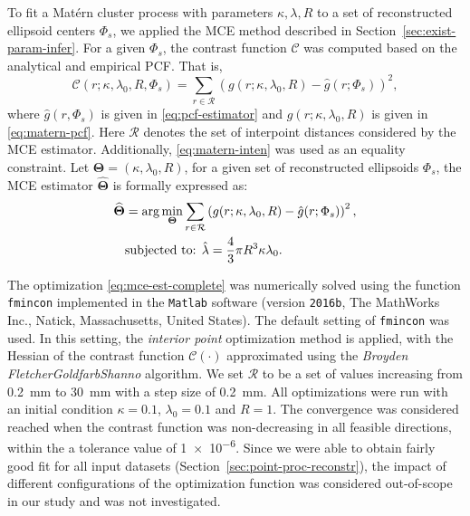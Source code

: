 \documentclass[journal]{IEEEtran}
\begin{document}
To fit a Mat\'ern cluster process with parameters $\kappa, \lambda, R$
to a set of reconstructed ellipsoid centers $\Phi_s$, we applied the
MCE method described in Section~\ref{sec:exist-param-infer}. For a
given $\Phi_s$, the contrast function $\mathcal{C}$ was computed based
on the analytical and empirical PCF. That is,
\begin{equation}
  \label{eq:matern-contrast}
  \mathcal{C}(r; \kappa, \lambda_0, R, \Phi_s) =
  \sum_{r \in \mathcal{R}} (g(r; \kappa, \lambda_0, R) -
  \hat{g}(r; \Phi_s))^2,
\end{equation}
where $\hat{g}(r, \Phi_s)$ is given in \eqref{eq:pcf-estimator} and
$g(r; \kappa, \lambda_0, R)$ is given in \eqref{eq:matern-pcf}. Here
$\mathcal{R}$ denotes the set of interpoint distances considered by
the MCE estimator. Additionally, \eqref{eq:matern-inten} was used as
an equality constraint. Let
$\mathbf{\Theta} = \left( \kappa, \lambda_0, R \right)$, for a given
set of reconstructed ellipsoids $\Phi_s$, the MCE estimator
$\widehat{\mathbf{\Theta}}$ is formally expressed as:
\begin{equation}
  \label{eq:mce-est-complete}
  \begin{aligned}
    \widehat{\mathbf{\Theta}} & = \arg \min_{\mathbf{\Theta}} \sum_{r
      \in \mathcal{R}} \left( g(r; \kappa, \lambda_0, R)
      - \hat{g}(r; \Phi_s) \right)^2, \\
    & \textnormal{subjected to: } \hat{\lambda} = \frac{4}{3}\pi
    R^3\kappa \lambda_0.
  \end{aligned}
\end{equation}

The optimization \eqref{eq:mce-est-complete} was numerically solved
using the function \texttt{fmincon} implemented in the \texttt{Matlab}
software (version \texttt{2016b}, The MathWorks Inc., Natick,
Massachusetts, United States). The default setting of \texttt{fmincon}
was used. In this setting, the \textit{interior point} optimization
method is applied, with the Hessian of the contrast function
$\mathcal{C}(\cdot)$ approximated using the \textit{Broyden\textendash
  Fletcher\textendash Goldfarb\textendash Shanno} algorithm. We set
$\mathcal{R}$ to be a set of values increasing from \SI{0.2}{\mm} to
\SI{30}{\mm} with a step size of \SI{0.2}{\mm}. All optimizations were
run with an initial condition $\kappa = 0.1$, $\lambda_0 = 0.1$ and
$R = 1$. The convergence was considered reached when the contrast
function was non-decreasing in all feasible directions, within the a
tolerance value of \num{1e-6}. Since we were able to obtain fairly
good fit for all input datasets
(Section~\ref{sec:point-proc-reconstr}), the impact of different
configurations of the optimization function was considered
out-of-scope in our study and was not investigated.
\end{document}
